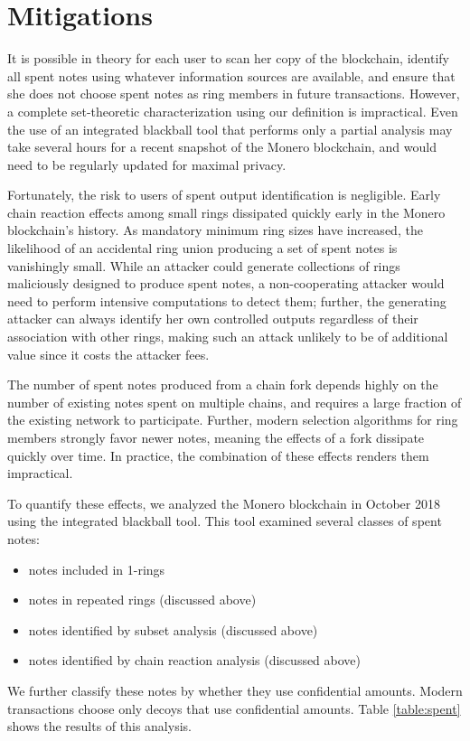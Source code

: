 \documentclass{mrl}
\begin{document}
\section{Mitigations}
It is possible in theory for each user to scan her copy of the blockchain, identify all spent notes using whatever information sources are available, and ensure that she does not choose spent notes as ring members in future transactions. However, a complete set-theoretic characterization using our definition is impractical. Even the use of an integrated blackball tool that performs only a partial analysis may take several hours for a recent snapshot of the Monero blockchain, and would need to be regularly updated for maximal privacy.

Fortunately, the risk to users of spent output identification is negligible. Early chain reaction effects among small rings dissipated quickly early in the Monero blockchain's history. As mandatory minimum ring sizes have increased, the likelihood of an accidental ring union producing a set of spent notes is vanishingly small. While an attacker could generate collections of rings maliciously designed to produce spent notes, a non-cooperating attacker would need to perform intensive computations to detect them; further, the generating attacker can always identify her own controlled outputs regardless of their association with other rings, making such an attack unlikely to be of additional value since it costs the attacker fees.

The number of spent notes produced from a chain fork depends highly on the number of existing notes spent on multiple chains, and requires a large fraction of the existing network to participate. Further, modern selection algorithms for ring members strongly favor newer notes, meaning the effects of a fork dissipate quickly over time. In practice, the combination of these effects renders them impractical.

To quantify these effects, we analyzed the Monero blockchain in October 2018 using the integrated blackball tool. This tool examined several classes of spent notes:
\begin{itemize}
\item notes included in 1-rings
\item notes in repeated rings (discussed above)
\item notes identified by subset analysis (discussed above)
\item notes identified by chain reaction analysis (discussed above)
\end{itemize}
We further classify these notes by whether they use confidential amounts. Modern transactions choose only decoys that use confidential amounts. Table \ref{table:spent} shows the results of this analysis.
\end{document}
